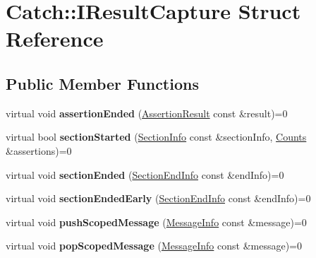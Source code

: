 \hypertarget{structCatch_1_1IResultCapture}{}\section{Catch\+:\+:I\+Result\+Capture Struct Reference}
\label{structCatch_1_1IResultCapture}
\subsection*{Public Member Functions}
\begin{DoxyCompactItemize}
\item 
virtual void {\bfseries assertion\+Ended} (\hyperlink{classCatch_1_1AssertionResult}{Assertion\+Result} const \&result)=0\hypertarget{structCatch_1_1IResultCapture_ae45e08bccc5fb434656d4f2e44742223}{}\label{structCatch_1_1IResultCapture_ae45e08bccc5fb434656d4f2e44742223}

\item 
virtual bool {\bfseries section\+Started} (\hyperlink{structCatch_1_1SectionInfo}{Section\+Info} const \&section\+Info, \hyperlink{structCatch_1_1Counts}{Counts} \&assertions)=0\hypertarget{structCatch_1_1IResultCapture_a5b76ed52badcb64cf374202e12b81a03}{}\label{structCatch_1_1IResultCapture_a5b76ed52badcb64cf374202e12b81a03}

\item 
virtual void {\bfseries section\+Ended} (\hyperlink{structCatch_1_1SectionEndInfo}{Section\+End\+Info} const \&end\+Info)=0\hypertarget{structCatch_1_1IResultCapture_a4e152bc43dc0933684e31fa67a58195d}{}\label{structCatch_1_1IResultCapture_a4e152bc43dc0933684e31fa67a58195d}

\item 
virtual void {\bfseries section\+Ended\+Early} (\hyperlink{structCatch_1_1SectionEndInfo}{Section\+End\+Info} const \&end\+Info)=0\hypertarget{structCatch_1_1IResultCapture_afcc71eef8ca821ae132cced4a2be6988}{}\label{structCatch_1_1IResultCapture_afcc71eef8ca821ae132cced4a2be6988}

\item 
virtual void {\bfseries push\+Scoped\+Message} (\hyperlink{structCatch_1_1MessageInfo}{Message\+Info} const \&message)=0\hypertarget{structCatch_1_1IResultCapture_a91d154c1e087e383dcde5aad95cb6a05}{}\label{structCatch_1_1IResultCapture_a91d154c1e087e383dcde5aad95cb6a05}

\item 
virtual void {\bfseries pop\+Scoped\+Message} (\hyperlink{structCatch_1_1MessageInfo}{Message\+Info} const \&message)=0\hypertarget{structCatch_1_1IResultCapture_a42bcb13276706bf8c3ce081ce16d37fd}{}\label{structCatch_1_1IResultCapture_a42bcb13276706bf8c3ce081ce16d37fd}


\end{DoxyCompactItemize}
